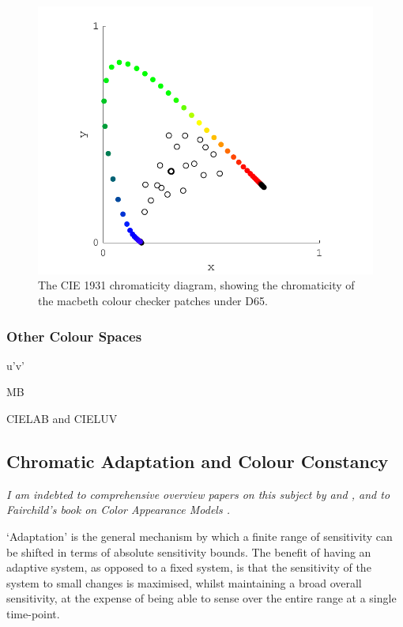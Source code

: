 \begin{figure}[htbp]
\includegraphics[max width=\textwidth]{figs/LitRev/ColorimetryDemo1.pdf}
\caption{The CIE 1931 chromaticity diagram, showing the chromaticity of the macbeth colour checker patches under D65.}
\label{fig:1931}
\end{figure}

\subsubsection{Other Colour Spaces}

u'v' 

\gls{MB}

CIELAB and CIELUV

\clearpage

\subsection{Chromatic Adaptation and Colour Constancy}

\textit{I am indebted to comprehensive overview papers on this subject by \citet{foster_color_2011} and \citet{smithson_colour_2004}, and to Fairchild's book on Color Appearance Models \citep{fairchild_color_2013}.}

`Adaptation' is the general mechanism by which a finite range of sensitivity can be shifted in terms of absolute sensitivity bounds. The benefit of having an adaptive system, as opposed to a fixed system, is that the sensitivity of the system to small changes is maximised, whilst maintaining a broad overall sensitivity, at the expense of being able to sense over the entire range at a single time-point. 

